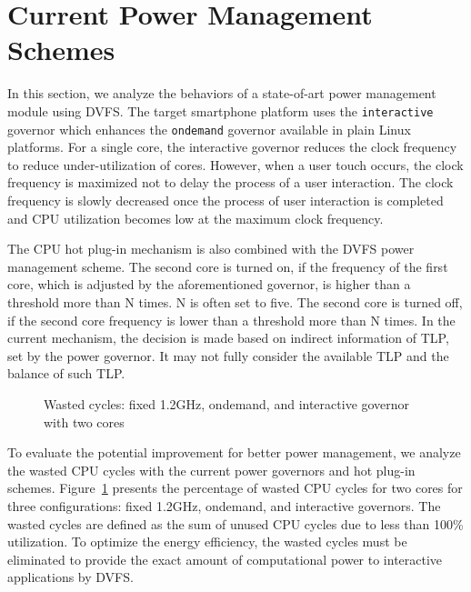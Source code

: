 \section{Current Power Management Schemes}

In this section, we analyze the behaviors of a state-of-art power management module using DVFS.
The target smartphone platform uses the {\tt interactive} governor which enhances the {\tt ondemand} governor
available in plain Linux platforms. For a single core, the interactive governor reduces the clock
frequency to reduce under-utilization of cores. However, when a user touch occurs, the clock frequency
is maximized not to delay the process of a user interaction. The clock frequency is slowly decreased once
the process of user interaction is completed and CPU utilization becomes low at the maximum clock frequency.

The CPU hot plug-in mechanism is also combined with the DVFS power management scheme. The second core is turned on,
if the frequency of the first core, which is adjusted by the aforementioned governor, is higher 
than a threshold more than N times. N is often set to five. The second core is turned off, if the second core 
frequency is lower than a threshold more than N times. In the current mechanism, the decision is made based
on indirect information of TLP, set by the power governor. It may not fully consider the available
TLP and the balance of such TLP.

\begin{figure}[bt]
\begin{center}
\end{center}
\caption{Wasted cycles: fixed 1.2GHz, ondemand, and interactive governor with two cores}
\label{fig:wasted_cycles}
\end{figure}

To evaluate the potential improvement for better power management, we analyze the wasted CPU cycles with
the current power governors and hot plug-in schemes. Figure~\ref{fig:wasted_cycles} presents the
percentage of wasted CPU cycles for two cores for three configurations: fixed 1.2GHz, ondemand,
and interactive governors. The wasted cycles are defined as the sum of unused CPU cycles due to
less than 100\% utilization. To optimize the energy efficiency, the wasted cycles must be
eliminated to provide the exact amount of computational power to interactive applications by
DVFS.  

